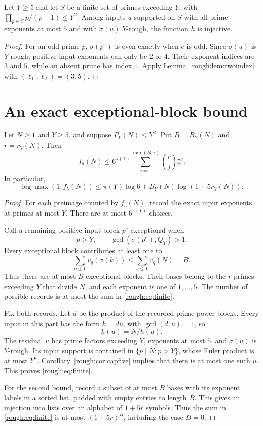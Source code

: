 \begin{corollary}\label{rough:cor:capfive}
Let $Y\ge5$ and let $S$ be a finite set of primes exceeding $Y$, with $\prod_{p\in S}p/(p-1)\le Y^2$. Among inputs $u$ supported on $S$ with all prime exponents at most $5$ and with $\sigma(u)$ $Y$-rough, the function $h$ is injective.
\end{corollary}
\begin{proof}
For an odd prime $p$, $\sigma(p^e)$ is even exactly when $e$ is odd. Since $\sigma(u)$ is $Y$-rough, positive input exponents can only be $2$ or $4$. Their exponent indices are $3$ and $5$, while an absent prime has index $1$. Apply Lemma~\ref{rough:lem:twoindex} with $(\ell_1,\ell_2)=(3,5)$.
\end{proof}


\section{An exact exceptional-block bound}
\begin{theorem}\label{rough:thm:finite}
Let $N\ge1$ and $Y\ge5$, and suppose $P_Y(N)\le Y^2$. Put $B=B_Y(N)$ and $r=r_Y(N)$. Then
\begin{equation}\label{rough:eq:finite}
 \boxed{f_5(N)\le6^{\pi(Y)}
 \sum_{j=0}^{\min(B,r)}\binom{r}{j}5^j.}
\end{equation}
In particular,
\begin{equation}\label{rough:eq:coarsefinite}
 \boxed{\log\max(1,f_5(N))
 \le\pi(Y)\log6+B_Y(N)\log(1+5r_Y(N)).}
\end{equation}
\end{theorem}
\begin{proof}
For each preimage counted by $f_5(N)$, record the exact input exponents at primes at most $Y$. There are at most $6^{\pi(Y)}$ choices.

Call a remaining positive input block $p^e$ exceptional when
\[
 p>Y,\qquad \gcd(\sigma(p^e),Q_Y)>1.
\]
Every exceptional block contributes at least one to
\[
 \sum_{q\le Y}v_q(\sigma(k))\le\sum_{q\le Y}v_q(N)=B.
\]
Thus there are at most $B$ exceptional blocks. Their bases belong to the $r$ primes exceeding $Y$ that divide $N$, and each exponent is one of $1,\ldots,5$. The number of possible records is at most the sum in \eqref{rough:eq:finite}.

Fix both records. Let $d$ be the product of the recorded prime-power blocks. Every input in this part has the form $k=du$, with $\gcd(d,u)=1$, so
\[
 h(u)=N/h(d).
\]
The residual $u$ has prime factors exceeding $Y$, exponents at most $5$, and $\sigma(u)$ is $Y$-rough. Its input support is contained in $\{p\mid N:p>Y\}$, whose Euler product is at most $Y^2$. Corollary~\ref{rough:cor:capfive} implies that there is at most one such $u$. This proves \eqref{rough:eq:finite}.

For the second bound, record a subset of at most $B$ bases with its exponent labels in a sorted list, padded with empty entries to length $B$. This gives an injection into lists over an alphabet of $1+5r$ symbols. Thus the sum in \eqref{rough:eq:finite} is at most $(1+5r)^B$, including the case $B=0$.
\end{proof}


